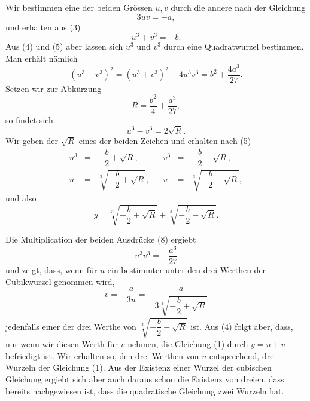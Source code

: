 \documentclass[11pt]{article}
\begin{document}
Wir bestimmen eine der beiden Grössen $u,v$ durch die andere nach der Gleichung
\begin{equation}
3uv=-a,
\tag{4}
\end{equation}
und erhalten aus (3)
\begin{equation}
u^3+v^3=-b.
\tag{5}
\end{equation}
Aus (4) und (5) aber lassen sich $u^3$ und $v^3$ durch eine Quadratwurzel bestimmen. Man erhält nämlich
\begin{equation}
(u^3-v^3)^2=(u^3+v^3)^2-4u^3v^3
=b^2+\frac{4a^3}{27}.
\tag{6}
\end{equation}
Setzen wir zur Abkürzung
\begin{equation}
R=\frac{b^2}{4}+\frac{a^3}{27},
\tag{7}
\end{equation}
so findet sich
\[
 u^3-v^3=2\sqrt R.
\]
Wir geben der $\sqrt R$ eines der beiden Zeichen und erhalten nach (5)
\begin{equation}
\begin{array}{rclcrcl}
u^3&=&-\dfrac b2+\sqrt R,&& v^3&=&-\dfrac b2-\sqrt R,\\[0.75em]
u&=&\sqrt[3]{-\dfrac b2+\sqrt R},&& v&=&\sqrt[3]{-\dfrac b2-\sqrt R},
\end{array}
\tag{8}
\end{equation}
und also
\begin{equation}
y=\sqrt[3]{-\frac b2+\sqrt R}+\sqrt[3]{-\frac b2-\sqrt R}.
\tag{9}
\end{equation}

Die Multiplication der beiden Ausdrücke (8) ergiebt
\[
 u^3v^3=-\frac{a^3}{27}
\]
und zeigt, dass, wenn für $u$ ein bestimmter unter den drei Werthen der Cubikwurzel genommen wird,
\begin{equation}
v=-\frac{a}{3u}=-\frac{a}{3\sqrt[3]{-\dfrac b2+\sqrt R}}
\tag{10}
\end{equation}
jedenfalls einer der drei Werthe von $\sqrt[3]{-\dfrac b2-\sqrt R}$ ist. Aus (4) folgt aber, dass, nur wenn wir diesen Werth für $v$ nehmen, die Gleichung (1) durch $y=u+v$ befriedigt ist. Wir erhalten so, den drei Werthen von $u$ entsprechend, drei Wurzeln der Gleichung (1). Aus der Existenz einer Wurzel der cubischen Gleichung ergiebt sich aber auch daraus schon die Existenz von dreien, dass bereits nachgewiesen ist, dass die quadratische Gleichung zwei Wurzeln hat.
\end{document}
